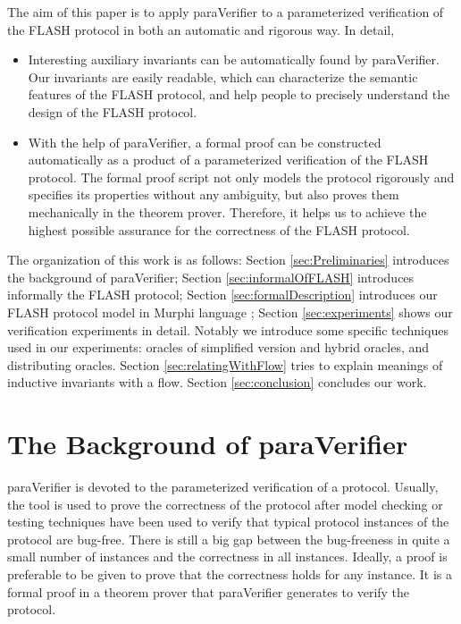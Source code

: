 \documentclass{llncs}
\newcommand{\bedt}[1]{{\color{black}#1}}
\begin{document}
The aim of this paper is to apply {\sf paraVerifier} \cite{liatva2015} to a  parameterized verification of the FLASH protocol in both an automatic and rigorous way. In detail,
\begin{itemize}
\item Interesting auxiliary invariants can be  automatically found by {\sf paraVerifier}. Our invariants are \bedt{easily readable}, which can characterize the semantic features of the FLASH protocol, and help people to precisely understand the design of the  FLASH protocol.

\item With the help of {\sf paraVerifier}, a formal proof can be constructed automatically as a product of a parameterized verification of the FLASH protocol. The formal proof script not  only models the protocol rigorously and specifies its properties without any ambiguity, but also proves them mechanically in the theorem prover. Therefore, it helps us to achieve the highest possible assurance for the correctness of the FLASH protocol.


\end{itemize}

The organization of this work is as follows: Section \ref{sec:Preliminaries} introduces the background of {\sf paraVerifier}; Section  \ref{sec:informalOfFLASH} introduces informally the FLASH protocol; Section \ref{sec:formalDescription} introduces our FLASH protocol model in Murphi \bedt{language} \cite{Dill1996}; Section \ref{sec:experiments} shows our verification experiments in detail. Notably we introduce some \bedt{specific techniques} used in our experiments: oracles of simplified version and hybrid oracles, and distributing oracles. Section \ref{sec:relatingWithFlow} tries to explain meanings of inductive invariants with a flow.  Section \ref{sec:conclusion} concludes our work.

\section{The Background  of {\sf paraVerifier}\label{sec:Preliminaries}}
{\sf paraVerifier} is devoted to the parameterized verification of a protocol. Usually, the tool is used to prove the correctness of the protocol after model checking or testing techniques have been used to verify that typical protocol instances of the protocol  are bug-free. There is still a big gap between the bug-freeness in quite a small number of instances and the correctness in all instances.  Ideally, a proof is preferable to be given to  prove that the correctness holds for any instance. It is a formal proof in a theorem prover that {\sf paraVerifier} generates to verify the protocol. %
\end{document}
